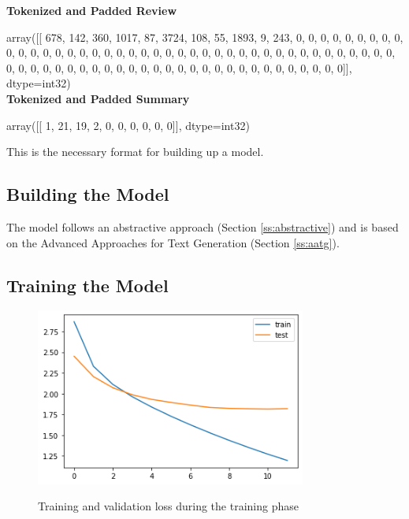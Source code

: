 \begin{tcolorbox}
	\textbf{Tokenized and Padded Review}
	
	array([[ 678,  142,  360, 1017,   87, 3724,  108,   55, 1893,    9,  243,
	0,    0,    0,    0,    0,    0,    0,    0,    0,    0,    0,
	0,    0,    0,    0,    0,    0,    0,    0,    0,    0,    0,
	0,    0,    0,    0,    0,    0,    0,    0,    0,    0,    0,
	0,    0,    0,    0,    0,    0,    0,    0,    0,    0,    0,
	0,    0,    0,    0,    0,    0,    0,    0,    0,    0,    0,
	0,    0,    0,    0,    0,    0,    0,    0,    0,    0,    0,
	0,    0,    0]], dtype=int32) \\
	
	\textbf{Tokenized and Padded Summary}
	
	array([[ 1, 21, 19,  2,  0,  0,  0,  0,  0,  0]], dtype=int32)
\end{tcolorbox}

This is the necessary format for building up a model.

\subsection{Building the Model}

The model follows an abstractive approach (Section \ref{ss:abstractive}) and is based on the Advanced Approaches for Text Generation (Section \ref{ss:aatg}). 

\subsection{Training the Model}

\begin{figure}
	\begin{center}
		\includegraphics[width=3.5in]{photos/eval}\\
		\caption{Training and validation loss during the training phase}\label{eval}
	\end{center}
\end{figure}

